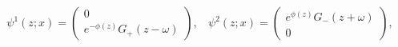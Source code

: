 \begin{equation}\label{modes}
\psi^1(z;x)=\left(\begin{array}{cr}
0 \\ e^{-\phi(z)}G_+(z-\omega)
\end{array}\right),~~~~
\psi^2(z;x)=\left(\begin{array}{cr}
e^{\phi(z)}G_-(z+\omega)\\
0
\end{array}\right),
\end{equation}


